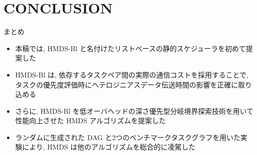 
\section{CONCLUSION}
\label{sec: conclusion}

\begin{frame}{まとめ}
    \begin{itemize}
        \item 本稿では, HMDS-Bl と名付けたリストベースの静的スケジューラを初めて提案した
        \item HMDS-Bl は, 依存するタスクペア間の実際の通信コストを採用することで, タスクの優先度評価時にヘテロジニアスデータ伝送時間の影響を正確に取り込める
        \item さらに, HMDS-Bl を低オーバヘッドの深さ優先型分岐境界探索技術を用いて性能向上させた HMDS アルゴリズムを提案した
        \item ランダムに生成された DAG と2つのベンチマークタスクグラフを用いた実験により, HMDS は他のアルゴリズムを総合的に凌駕した
    \end{itemize}
\end{frame}
